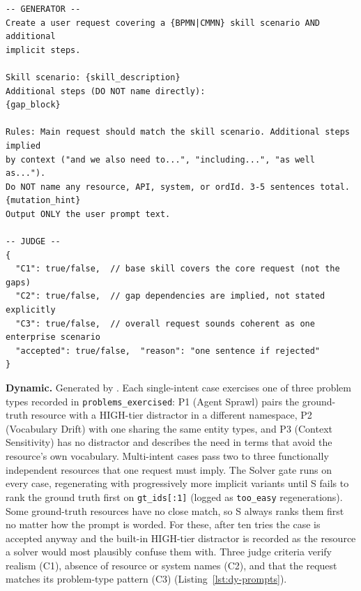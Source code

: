 \begin{lstlisting}[float=!t, floatplacement=!t, basicstyle=\ttfamily\scriptsize, breaklines=true, frame=single, label={lst:sa-prompts}, caption={SA Generator + Judge prompts. The mutation hint is strengthened on each retry (synonym vocabulary, then implicit references).}]
-- GENERATOR --
Create a user request covering a {BPMN|CMMN} skill scenario AND additional
implicit steps.

Skill scenario: {skill_description}
Additional steps (DO NOT name directly):
{gap_block}

Rules: Main request should match the skill scenario. Additional steps implied
by context ("and we also need to...", "including...", "as well as...").
Do NOT name any resource, API, system, or ordId. 3-5 sentences total.
{mutation_hint}
Output ONLY the user prompt text.

-- JUDGE --
{
  "C1": true/false,  // base skill covers the core request (not the gaps)
  "C2": true/false,  // gap dependencies are implied, not stated explicitly
  "C3": true/false,  // overall request sounds coherent as one enterprise scenario
  "accepted": true/false,  "reason": "one sentence if rejected"
}
\end{lstlisting}

\medskip\noindent\textbf{Dynamic.} Generated by . Each single-intent case exercises one of three problem types recorded in \texttt{problems\_exercised}: P1 (Agent Sprawl) pairs the ground-truth resource with a HIGH-tier distractor in a different namespace, P2 (Vocabulary Drift) with one sharing the same entity types, and P3 (Context Sensitivity) has no distractor and describes the need in terms that avoid the resource's own vocabulary. Multi-intent cases pass two to three functionally independent resources that one request must imply. The Solver gate runs on every case, regenerating with progressively more implicit variants until S fails to rank the ground truth first on \texttt{gt\_ids[:1]} (logged as \texttt{too\_easy} regenerations). Some ground-truth resources have no close match, so S always ranks them first no matter how the prompt is worded. For these, after ten tries the case is accepted anyway and the built-in HIGH-tier distractor is recorded as the resource a solver would most plausibly confuse them with. Three judge criteria verify realism (C1), absence of resource or system names (C2), and that the request matches its problem-type pattern (C3) (Listing~\ref{lst:dy-prompts}).

